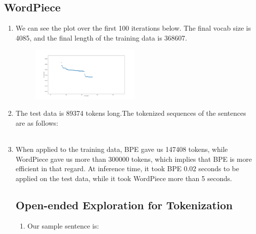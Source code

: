 \documentclass[12pt]{article}
\begin{document}
\begin{center}
\section{WordPiece}
\begin{enumerate}[label=(\alph*)]
\item We can see the plot over the first 100 iterations below. The final vocab size is 4085, and the final length of the training data is 368607.
\begin{figure}[H]
	\centering
	\includegraphics[width=0.5\textwidth]{wp.png}
\end{figure}
\item The test data is 89374 tokens long.The tokenized sequences of the sentences are as follows:
\vspace{0.5cm} \\
\fussy
\vspace{0.5cm} \\
\fussy
\item When applied to the training data, BPE gave us 147408 tokens, while WordPiece gave us more than 300000 tokens, which implies that BPE is more efficient in that regard. At inference time, it took BPE $0.02$ seconds to be applied on the test data, while it took WordPiece more than 5 seconds.

\newpage
\section{Open-ended Exploration for Tokenization}
\begin{enumerate}
	\item Our sample sentence is:
	

\end{enumerate}
\end{enumerate}
\end{center}
\end{document}
